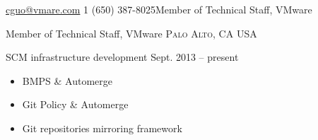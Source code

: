 \documentclass[10pt,letterpaper]{article}
\begin{document}
 



\noindent\href{mailto:cguo@vmware.com}{cguo@vmare.com}\bull
\textsmaller{+}1 (650) 387-8025\bull Member of Technical Staff, VMware

\spacedhrule{0.9em}{-0.4em} %



\headedsection
{Member of Technical Staff, VMware}
{\textsc{Palo Alto, CA USA}} {
\headedsubsection 
{SCM infrastructure development} {Sept. 2013 -- present}
{
    \begin{itemize}
        \item BMPS \& Automerge
        \item Git Policy \& Automerge
        \item Git repositories mirroring framework
    \end{itemize}
}
}
\end{document}

